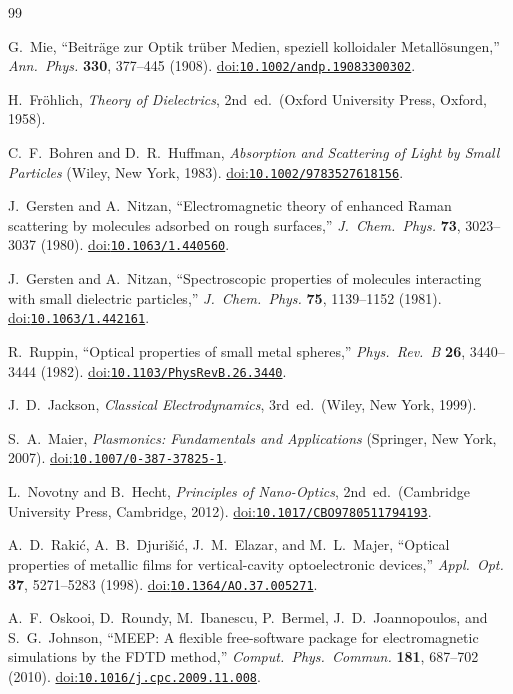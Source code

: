 \documentclass[11pt,a4paper]{article}
\newcommand{\doiref}[1]{\href{https://doi.org/#1}{doi:\nolinkurl{#1}}}
\begin{document}
\begin{thebibliography}{99}

G.~Mie,
``Beitr\"{a}ge zur Optik tr\"{u}ber Medien, speziell kolloidaler Metall\"{o}sungen,''
\emph{Ann.\ Phys.} \textbf{330}, 377--445 (1908).
\doiref{10.1002/andp.19083300302}.

H.~Fr\"{o}hlich,
\emph{Theory of Dielectrics},
2nd~ed.\ (Oxford University Press, Oxford, 1958).

C.~F.~Bohren and D.~R.~Huffman,
\emph{Absorption and Scattering of Light by Small Particles}
(Wiley, New York, 1983).
\doiref{10.1002/9783527618156}.

J.~Gersten and A.~Nitzan,
``Electromagnetic theory of enhanced Raman scattering by molecules adsorbed on
rough surfaces,''
\emph{J.\ Chem.\ Phys.} \textbf{73}, 3023--3037 (1980).
\doiref{10.1063/1.440560}.

J.~Gersten and A.~Nitzan,
``Spectroscopic properties of molecules interacting with small dielectric
particles,''
\emph{J.\ Chem.\ Phys.} \textbf{75}, 1139--1152 (1981).
\doiref{10.1063/1.442161}.

R.~Ruppin,
``Optical properties of small metal spheres,''
\emph{Phys.\ Rev.\ B} \textbf{26}, 3440--3444 (1982).
\doiref{10.1103/PhysRevB.26.3440}.

J.~D.~Jackson,
\emph{Classical Electrodynamics},
3rd~ed.\ (Wiley, New York, 1999).

S.~A.~Maier,
\emph{Plasmonics: Fundamentals and Applications}
(Springer, New York, 2007).
\doiref{10.1007/0-387-37825-1}.

L.~Novotny and B.~Hecht,
\emph{Principles of Nano-Optics},
2nd~ed.\ (Cambridge University Press, Cambridge, 2012).
\doiref{10.1017/CBO9780511794193}.

A.~D.~Raki\'{c}, A.~B.~Djuri\v{s}i\'{c}, J.~M.~Elazar, and M.~L.~Majer,
``Optical properties of metallic films for vertical-cavity optoelectronic
devices,''
\emph{Appl.\ Opt.} \textbf{37}, 5271--5283 (1998).
\doiref{10.1364/AO.37.005271}.

A.~F.~Oskooi, D.~Roundy, M.~Ibanescu, P.~Bermel, J.~D.~Joannopoulos, and
S.~G.~Johnson,
``{MEEP}: A flexible free-software package for electromagnetic simulations by
the {FDTD} method,''
\emph{Comput.\ Phys.\ Commun.} \textbf{181}, 687--702 (2010).
\doiref{10.1016/j.cpc.2009.11.008}.


\end{thebibliography}
\end{document}
